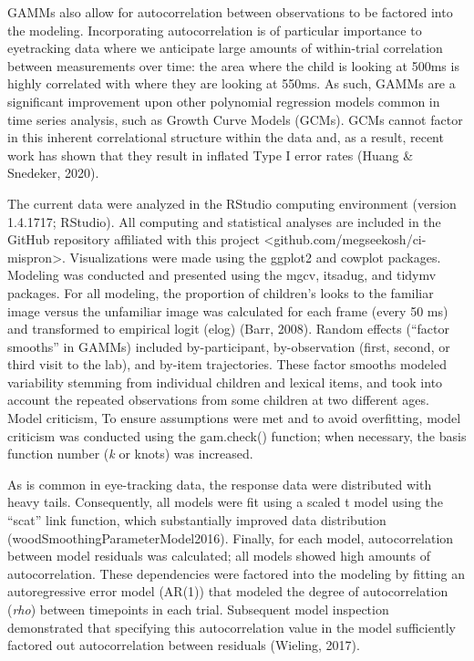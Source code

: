 \documentclass[
]{article}
\begin{document}
GAMMs also allow for autocorrelation between observations to be factored into the modeling. Incorporating autocorrelation is of particular importance to eyetracking data where we anticipate large amounts of within-trial correlation between measurements over time: the area where the child is looking at 500ms is highly correlated with where they are looking at 550ms. As such, GAMMs are a significant improvement upon other polynomial regression models common in time series analysis, such as Growth Curve Models (GCMs). GCMs cannot factor in this inherent correlational structure within the data and, as a result, recent work has shown that they result in inflated Type I error rates (Huang \& Snedeker, 2020).

The current data were analyzed in the RStudio computing environment (version 1.4.1717; RStudio). All computing and statistical analyses are included in the GitHub repository affiliated with this project \textless github.com/megseekosh/ci-mispron\textgreater. Visualizations were made using the ggplot2 and cowplot packages. Modeling was conducted and presented using the mgcv, itsadug, and tidymv packages. For all modeling, the proportion of children's looks to the familiar image versus the unfamiliar image was calculated for each frame (every 50 ms) and transformed to empirical logit (elog) (Barr, 2008). Random effects (``factor smooths'' in GAMMs) included by-participant, by-observation (first, second, or third visit to the lab), and by-item trajectories. These factor smooths modeled variability stemming from individual children and lexical items, and took into account the repeated observations from some children at two different ages. Model criticism, To ensure assumptions were met and to avoid overfitting, model criticism was conducted using the gam.check() function; when necessary, the basis function number (\emph{k} or knots) was increased.

As is common in eye-tracking data, the response data were distributed with heavy tails. Consequently, all models were fit using a scaled t model using the ``scat'' link function, which substantially improved data distribution (woodSmoothingParameterModel2016). Finally, for each model, autocorrelation between model residuals was calculated; all models showed high amounts of autocorrelation. These dependencies were factored into the modeling by fitting an autoregressive error model (AR(1)) that modeled the degree of autocorrelation (\emph{rho}) between timepoints in each trial. Subsequent model inspection demonstrated that specifying this autocorrelation value in the model sufficiently factored out autocorrelation between residuals (Wieling, 2017).
\end{document}
